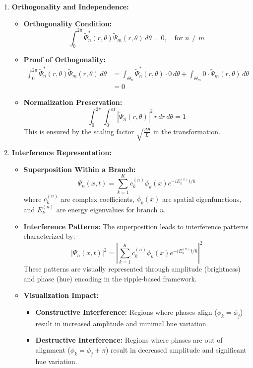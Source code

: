 \documentclass[12pt]{article}
\begin{document}
\begin{enumerate}
    \item \textbf{Orthogonality and Independence:}
    \begin{itemize}
        \item \textbf{Orthogonality Condition:}
        \[
        \int_{0}^{2\pi} \tilde{\Psi}_n^*(r, \theta) \tilde{\Psi}_m(r, \theta) \, d\theta = 0, \quad \text{for } n \neq m
        \]
        
        \item \textbf{Proof of Orthogonality:}
        \begin{align*}
            \int_{0}^{2\pi} \tilde{\Psi}_n^*(r, \theta) \tilde{\Psi}_m(r, \theta) \, d\theta 
            &= \int_{\Theta_n} \tilde{\Psi}_n^*(r, \theta) \cdot 0 \, d\theta + \int_{\Theta_m} 0 \cdot \tilde{\Psi}_m(r, \theta) \, d\theta \\
            &= 0
        \end{align*}
        
        \item \textbf{Normalization Preservation:}
        \[
        \int_{0}^{2\pi} \int_{0}^{\alpha t} |\tilde{\Psi}_n(r,\theta)|^2 \, r \, dr \, d\theta = 1
        \]
        This is ensured by the scaling factor \(\sqrt{\frac{\Delta\theta}{L}}\) in the transformation.
    \end{itemize}
    
    \item \textbf{Interference Representation:}
    \begin{itemize}
        \item \textbf{Superposition Within a Branch:}
        \[
        \Psi_n(x,t) = \sum_{k=1}^{K} c_{k}^{(n)} \phi_{k}(x) e^{-i E_{k}^{(n)} t / \hbar}
        \]
        where \(c_{k}^{(n)}\) are complex coefficients, \(\phi_{k}(x)\) are spatial eigenfunctions, and \(E_{k}^{(n)}\) are energy eigenvalues for branch \(n\).
        
        \item \textbf{Interference Patterns:}
        The superposition leads to interference patterns characterized by:
        \[
        |\Psi_n(x,t)|^2 = \left| \sum_{k=1}^{K} c_{k}^{(n)} \phi_{k}(x) e^{-i E_{k}^{(n)} t / \hbar} \right|^2
        \]
        These patterns are visually represented through amplitude (brightness) and phase (hue) encoding in the ripple-based framework.
        
        \item \textbf{Visualization Impact:}
        \begin{itemize}
            \item \textbf{Constructive Interference:} Regions where phases align (\(\phi_k = \phi_j\)) result in increased amplitude and minimal hue variation.
            \item \textbf{Destructive Interference:} Regions where phases are out of alignment (\(\phi_k = \phi_j + \pi\)) result in decreased amplitude and significant hue variation.
        \end{itemize}
        

\end{itemize}
\end{enumerate}
\end{document}
